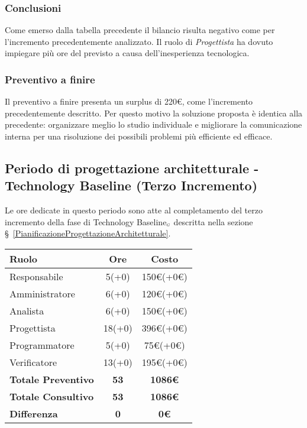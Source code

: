 {{{{{\subsubsection{Conclusioni}
Come emerso dalla tabella precedente il bilancio risulta negativo come per l'incremento precedentemente analizzato. Il ruolo di \textit{Progettista} ha dovuto impiegare più ore del previsto a causa dell'inesperienza tecnologica.

\subsubsection{Preventivo a finire}
Il preventivo a finire presenta un surplus di 220\euro, come l'incremento precedentemente descritto. Per questo motivo la soluzione proposta è identica alla precedente: organizzare meglio lo studio individuale e migliorare la comunicazione interna per una risoluzione dei possibili problemi più efficiente ed efficace.

\subsection{Periodo di progettazione architetturale - Technology Baseline (Terzo Incremento)}\label{ConsuntivoPeriodoDiProgettazioneArchitetturaleTechnologyBaselineTerzoIncremento}

Le ore dedicate in questo periodo sono atte al completamento del terzo incremento della fase di Technology Baseline$_{\scaleto{G}{3pt}}$ descritta nella sezione \S~\ref{PianificazioneProgettazioneArchitetturale}.

\quad
\def\tabularxcolumn#1{m{#1}}
{
	\begin{center}
		\renewcommand{\arraystretch}{1.4}
		\begin{tabularx}{10cm}{|X|c|c|}
			\hline
			\rowcolor{airforceblue}
			\textbf{Ruolo} & \textbf{Ore} & \textbf{Costo}\\
			\hline
			Responsabile & 5(+0) & 150\euro(+0\euro)\\
			\hline
			Amministratore & 6(+0) & 120\euro(+0\euro)\\
			\hline
			Analista & 6(+0) & 150\euro(+0\euro)\\
			\hline
			Progettista & 18(+0) & 396\euro(+0\euro)\\
			\hline
			Programmatore & 5(+0) & 75\euro(+0\euro)\\
			\hline
			Verificatore & 13(+0) & 195\euro(+0\euro)\\
			\hline
			\textbf{Totale Preventivo} & \textbf{53} & \textbf{1086\euro}\\
			\hline
			\textbf{Totale Consultivo} & \textbf{53} & \textbf{1086\euro}\\
			\hline
			\textbf{Differenza} & \textbf{0} & \textbf{0\euro}
		\end{tabularx}
	\end{center}

}}}}}}
